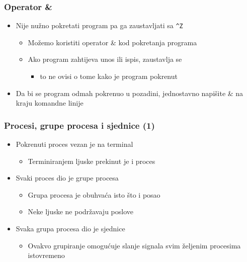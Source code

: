 \documentclass[table,usenames,dvipsnames]{beamer}
\newcommand{\shell}[1]{\texttt{#1}}
\begin{document}
\begin{frame}[t]
\frametitle{Operator \&}
\begin{itemize}
  \item Nije nužno pokretati program pa ga zaustavljati sa 
        \shell{\textasciicircum{}Z}
  \begin{itemize}
    \item Možemo koristiti operator \& kod pokretanja programa
    \item Ako program zahtijeva unos ili ispis, zaustavlja se
    \begin{itemize}
      \item to ne ovisi o tome kako je program pokrenut
    \end{itemize}
  \end{itemize}
  \item Da bi se program odmah pokrenuo u pozadini, jednostavno napišite \& na 
        kraju komandne linije
\end{itemize}
\end{frame}

\begin{frame}[t]
\frametitle{Procesi, grupe procesa i sjednice (1)}
\begin{itemize}
  \item Pokrenuti proces vezan je na terminal
  \begin{itemize}
    \item Terminiranjem ljuske prekinut je i proces
  \end{itemize}
  \item Svaki proces dio je grupe procesa
  \begin{itemize}
    \item Grupa procesa je obuhvaća isto što i posao
    \item Neke ljuske ne podržavaju poslove
  \end{itemize}
  \item Svaka grupa procesa dio je sjednice
  \begin{itemize}
    \item Ovakvo grupiranje omogućuje slanje signala svim željenim procesima 
          istovremeno
  \end{itemize}
\end{itemize}
\end{frame}
\end{document}
